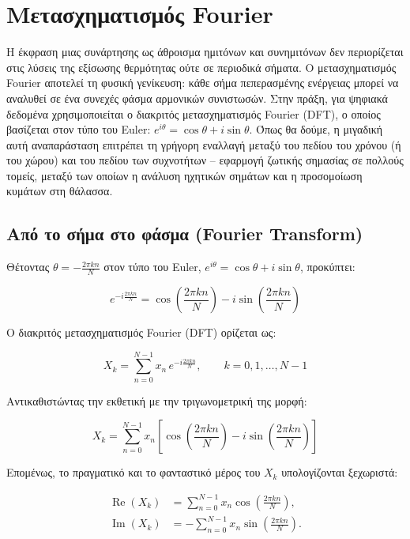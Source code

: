 \documentclass[a4paper, 11pt]{article}
\begin{document}
\section{Μετασχηματισμός
Fourier}\label{ux3bcux3b5ux3c4ux3b1ux3c3ux3c7ux3b7ux3bcux3b1ux3c4ux3b9ux3c3ux3bcux3ccux3c2-fourier}

Η έκφραση μιας συνάρτησης ως άθροισμα ημιτόνων και συνημιτόνων δεν
περιορίζεται στις λύσεις της εξίσωσης θερμότητας ούτε σε περιοδικά
σήματα. Ο μετασχηματισμός Fourier αποτελεί τη φυσική γενίκευση: κάθε
σήμα πεπερασμένης ενέργειας μπορεί να αναλυθεί σε ένα συνεχές φάσμα
αρμονικών συνιστωσών. Στην πράξη, για ψηφιακά δεδομένα χρησιμοποιείται ο
διακριτός μετασχηματισμός Fourier (DFT), ο οποίος βασίζεται στον τύπο
του Euler: \(e^{i\theta} = \cos\theta + i\sin\theta\). Όπως θα δούμε, η
μιγαδική αυτή αναπαράσταση επιτρέπει τη γρήγορη εναλλαγή μεταξύ του
πεδίου του χρόνου (ή του χώρου) και του πεδίου των συχνοτήτων --
εφαρμογή ζωτικής σημασίας σε πολλούς τομείς, μεταξύ των οποίων η ανάλυση
ηχητικών σημάτων και η προσομοίωση κυμάτων στη θάλασσα.

\subsection{Από το σήμα στο φάσμα (Fourier
Transform)}\label{ux3b1ux3c0ux3cc-ux3c4ux3bf-ux3c3ux3aeux3bcux3b1-ux3c3ux3c4ux3bf-ux3c6ux3acux3c3ux3bcux3b1-fourier-transform}

Θέτοντας \(\theta = -\frac{2\pi kn}{N}\) στον τύπο του Euler,
\(e^{i\theta} = \cos\theta + i\sin\theta\), προκύπτει:

\[e^{-i\frac{2\pi kn}{N}} = \cos\!\left(\frac{2\pi kn}{N}\right) - i\sin\!\left(\frac{2\pi kn}{N}\right)\]

Ο διακριτός μετασχηματισμός Fourier (DFT) ορίζεται ως:

\[X_k = \sum_{n=0}^{N-1} x_n \, e^{-i\frac{2\pi kn}{N}}, \qquad k = 0,1,\dots,N-1\]

Αντικαθιστώντας την εκθετική με την τριγωνομετρική της μορφή:

\[X_k = \sum_{n=0}^{N-1} x_n \left[\cos\!\left(\frac{2\pi kn}{N}\right) - i\sin\!\left(\frac{2\pi kn}{N}\right)\right]\]

Επομένως, το πραγματικό και το φανταστικό μέρος του \(X_k\)
υπολογίζονται ξεχωριστά:

\[\begin{aligned}
\operatorname{Re}(X_k) &= \sum_{n=0}^{N-1} x_n \cos\!\left(\frac{2\pi kn}{N}\right), \\[4pt]
\operatorname{Im}(X_k) &= -\sum_{n=0}^{N-1} x_n \sin\!\left(\frac{2\pi kn}{N}\right).
\end{aligned}\]
\end{document}
